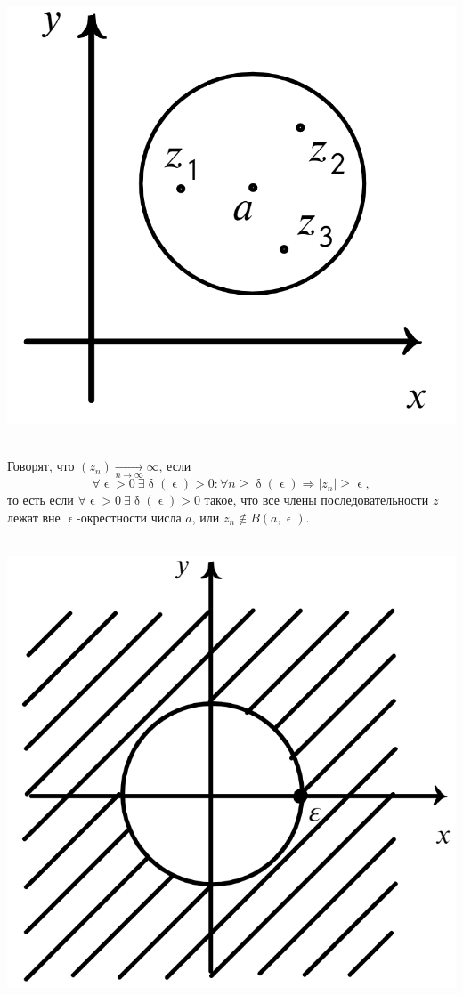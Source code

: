 \documentclass[a4paper, 12pt]{article}
\renewcommand{\delta}{\updelta}
\renewcommand{\epsilon}{\upvarepsilon}
\newcommand{\limdef}{\forall \epsilon >0\ \exists \delta (\epsilon) > 0}
\begin{document}
\hfill
\parbox[b][4.5cm][t]{70mm}{
	\includegraphics[scale=0.35]{images/012.png}}\\
Говорят, что $(z_n)\underset{n\to\infty}{\longrightarrow} \infty$, если $$\limdef:\forall n \geqslant \delta (\epsilon)\Rightarrow |z_n|\geqslant\epsilon,$$
то есть если $\limdef$ такое, что все члены последовательности $z$ лежат вне $\epsilon$-окрестности числа $a$, или $z_n \not \in B(a,\epsilon)$.\\\\
\noindent
\parbox[b][4.5cm][t]{10mm}{
	\includegraphics[scale=0.4]{images/014.png}}
\end{document}
